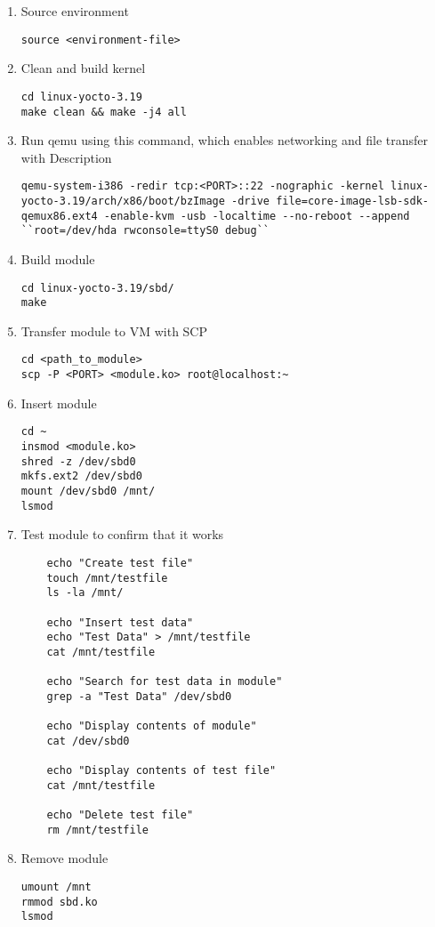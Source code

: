 \documentclass[onecolumn, draftclsnofoot,10pt, compsoc]{IEEEtran}
\begin{document}
	\begin{enumerate}

	\item Source environment
	\begin{lstlisting}
source <environment-file>
\end{lstlisting}

	\item Clean and build kernel
	\begin{lstlisting}
cd linux-yocto-3.19
make clean && make -j4 all
\end{lstlisting}

	\item Run qemu using this command, which enables networking and file transfer with Description
	\begin{lstlisting}
qemu-system-i386 -redir tcp:<PORT>::22 -nographic -kernel linux-yocto-3.19/arch/x86/boot/bzImage -drive file=core-image-lsb-sdk-qemux86.ext4 -enable-kvm -usb -localtime --no-reboot --append ``root=/dev/hda rwconsole=ttyS0 debug``
\end{lstlisting}

\item Build module
\begin{lstlisting}
cd linux-yocto-3.19/sbd/
make
\end{lstlisting}

	\item Transfer module to VM with SCP
	\begin{lstlisting}
cd <path_to_module>
scp -P <PORT> <module.ko> root@localhost:~
\end{lstlisting}

	\item Insert module
	\begin{lstlisting}
cd ~
insmod <module.ko>
shred -z /dev/sbd0
mkfs.ext2 /dev/sbd0
mount /dev/sbd0 /mnt/
lsmod
\end{lstlisting}

	\item Test module to confirm that it works
	\begin{lstlisting}
	echo "Create test file"
	touch /mnt/testfile
	ls -la /mnt/

	echo "Insert test data"
	echo "Test Data" > /mnt/testfile
	cat /mnt/testfile

	echo "Search for test data in module"
	grep -a "Test Data" /dev/sbd0

	echo "Display contents of module"
	cat /dev/sbd0

	echo "Display contents of test file"
	cat /mnt/testfile

	echo "Delete test file"
	rm /mnt/testfile
\end{lstlisting}

\item Remove module
\begin{lstlisting}
umount /mnt
rmmod sbd.ko
lsmod
\end{lstlisting}

	\end{enumerate}
\end{document}
